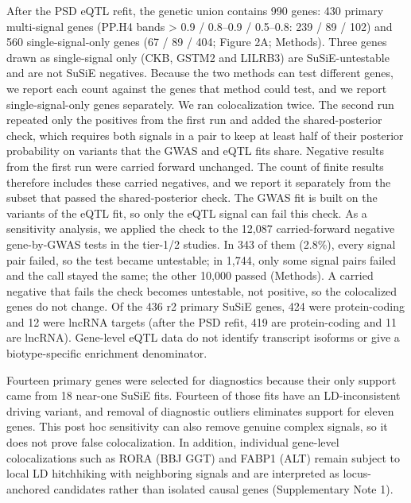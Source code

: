

After the PSD eQTL refit, the genetic union contains 990 genes: 430 primary multi-signal genes (PP.H4 bands \textgreater{} 0.9 / 0.8--0.9 / 0.5--0.8: 239 / 89 / 102) and 560 single-signal-only genes (67 / 89 / 404; Figure 2A; Methods). Three genes drawn as single-signal only (CKB, GSTM2 and LILRB3) are SuSiE-untestable and are not SuSiE negatives. Because the two methods can test different genes, we report each count against the genes that method could test, and we report single-signal-only genes separately. We ran colocalization twice. The second run repeated only the positives from the first run and added the shared-posterior check, which requires both signals in a pair to keep at least half of their posterior probability on variants that the GWAS and eQTL fits share. Negative results from the first run were carried forward unchanged. The count of finite results therefore includes these carried negatives, and we report it separately from the subset that passed the shared-posterior check. The GWAS fit is built on the variants of the eQTL fit, so only the eQTL signal can fail this check. As a sensitivity analysis, we applied the check to the 12,087 carried-forward negative gene-by-GWAS tests in the tier-1/2 studies. In 343 of them (2.8\%), every signal pair failed, so the test became untestable; in 1,744, only some signal pairs failed and the call stayed the same; the other 10,000 passed (Methods). A carried negative that fails the check becomes untestable, not positive, so the colocalized genes do not change. Of the 436 r2 primary SuSiE genes, 424 were protein-coding and 12 were lncRNA targets (after the PSD refit, 419 are protein-coding and 11 are lncRNA). Gene-level eQTL data do not identify transcript isoforms or give a biotype-specific enrichment denominator.

Fourteen primary genes were selected for diagnostics because their only support came from 18 near-one SuSiE fits. Fourteen of those fits have an LD-inconsistent driving variant, and removal of diagnostic outliers eliminates support for eleven genes. This post hoc sensitivity can also remove genuine complex signals, so it does not prove false colocalization. In addition, individual gene-level colocalizations such as RORA (BBJ GGT) and FABP1 (ALT) remain subject to local LD hitchhiking with neighboring signals and are interpreted as locus-anchored candidates rather than isolated causal genes (Supplementary Note 1).

